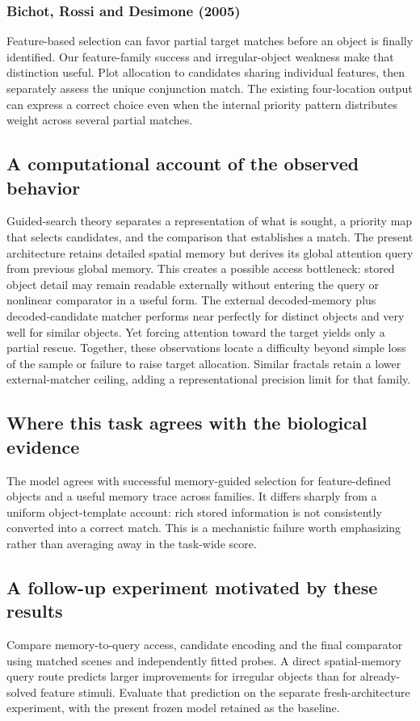\documentclass[11pt]{article}
\begin{document}
\subsubsection{Bichot, Rossi and Desimone (2005)}
Feature-based selection can favor partial target matches before an object is finally identified. Our feature-family success and irregular-object weakness make that distinction useful. Plot allocation to candidates sharing individual features, then separately assess the unique conjunction match. The existing four-location output can express a correct choice even when the internal priority pattern distributes weight across several partial matches. \cite{bio_bichot}

\subsection{A computational account of the observed behavior}
Guided-search theory separates a representation of what is sought, a priority map that selects candidates, and the comparison that establishes a match. The present architecture retains detailed spatial memory but derives its global attention query from previous global memory. This creates a possible access bottleneck: stored object detail may remain readable externally without entering the query or nonlinear comparator in a useful form. The external decoded-memory plus decoded-candidate matcher performs near perfectly for distinct objects and very well for similar objects. Yet forcing attention toward the target yields only a partial rescue. Together, these observations locate a difficulty beyond simple loss of the sample or failure to raise target allocation. Similar fractals retain a lower external-matcher ceiling, adding a representational precision limit for that family. \cite{bio_wolfe}

\subsection{Where this task agrees with the biological evidence}
The model agrees with successful memory-guided selection for feature-defined objects and a useful memory trace across families. It differs sharply from a uniform object-template account: rich stored information is not consistently converted into a correct match. This is a mechanistic failure worth emphasizing rather than averaging away in the task-wide score.

\subsection{A follow-up experiment motivated by these results}
Compare memory-to-query access, candidate encoding and the final comparator using matched scenes and independently fitted probes. A direct spatial-memory query route predicts larger improvements for irregular objects than for already-solved feature stimuli. Evaluate that prediction on the separate fresh-architecture experiment, with the present frozen model retained as the baseline.
\end{document}
